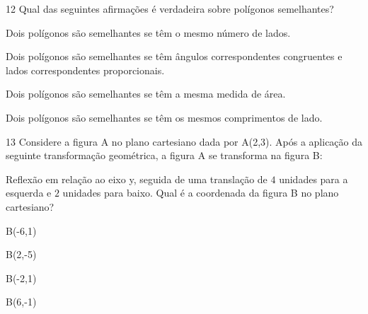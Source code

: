 \num{12} Qual das seguintes afirmações é verdadeira sobre polígonos
semelhantes?

\begin{escolha}
\item Dois polígonos são semelhantes se têm o mesmo número de lados.
\item Dois polígonos são semelhantes se têm ângulos correspondentes
congruentes e lados correspondentes proporcionais.
\item Dois polígonos são semelhantes se têm a mesma medida de área.
\item Dois polígonos são semelhantes se têm os mesmos comprimentos de lado.
\end{escolha}



\num{13} Considere a figura A no plano cartesiano dada por A(2,3). Após a
aplicação da seguinte transformação geométrica, a figura A se transforma
na figura B:

Reflexão em relação ao eixo y, seguida de uma translação de $4$ unidades
para a esquerda e $2$ unidades para baixo. Qual é a coordenada da figura B no plano cartesiano?

\begin{escolha}
\item B(-6,1)
\item B(2,-5)
\item B(-2,1)
\item B(6,-1)
\end{escolha}

